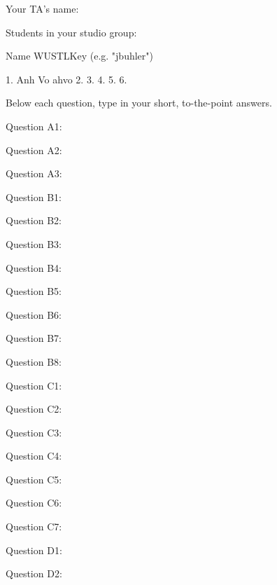 Your TA's name:

Students in your studio group:

    Name        WUSTLKey (e.g. "jbuhler")

1. Anh Vo         ahvo
2.
3.
4.
5.
6.

Below each question, type in your short, to-the-point answers.

Question A1:

Question A2:

Question A3:

Question B1:

Question B2:

Question B3:

Question B4:

Question B5:

Question B6:

Question B7:

Question B8:

Question C1:

Question C2:

Question C3:

Question C4:

Question C5:

Question C6:

Question C7:

Question D1:

Question D2:
